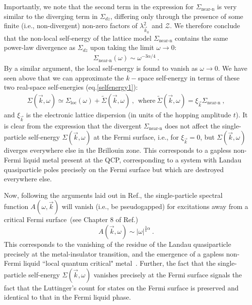 \documentclass[reprint,hidelinks,onecolumn]{revtex4-2}
\begin{document}
Importantly, we note that the second term in the expression for \(\Sigma_\text{near-n}\) is very similar to the diverging term in \(\Sigma_{dz}\), differing only through the presence of some finite (i.e., non-divergent) non-zero factors of \(\lambda_{\vec k_0}^2\) and \(\mathcal{Z}\). We therefore conclude that the non-local self-energy of the lattice model $\Sigma_\text{near-n}$ contains the same power-law divergence  as $\Sigma_{dz}$ upon taking the limit $\omega\to 0$:
\begin{equation}\begin{aligned}
	\Sigma_\text{near-n}\left( \omega \right) \sim \omega^{-3\alpha/4}~.
\end{aligned}\end{equation}
By a similar argument, the local self-energy is found to vanish as \(\omega \to 0\). We have seen above that we can approximate the \(k-\)space self-energy in terms of these two real-space self-energies (eq.\eqref{selfenergy1}):
\begin{equation}\begin{aligned}
	\Sigma(\vec k, \omega) \simeq \Sigma_\text{loc}(\omega) + \tilde{\Sigma}(\vec k, \omega)~,~~\textrm{where}~\tilde{\Sigma}(\vec k, \omega)=\xi_{\vec k}\Sigma_\text{near-n}~,
\end{aligned}\end{equation}
and $\xi_{\vec{k}}$ is the electronic lattice dispersion (in units of the hopping amplitude $t$). It is clear from the expression that the divergent $\Sigma_\text{near-n}$ does not affect the single-particle self-energy $\Sigma(\vec k,\omega)$ at the Fermi surface, i.e., for $\xi_{\vec{k}}= 0$, but $\Sigma(\vec k,\omega)$ diverges everywhere else in the Brillouin zone. This corresponds to a gapless non-Fermi liquid metal present at the QCP, corresponding to a system with Landau quasiparticle poles precisely on the Fermi surface but which are destroyed everywhere else.

Now, following the arguments laid out in Ref.\cite{sujan2023}, the single-particle spectral function $A(\omega,\vec{k})$ will vanish (i.e., be pseudogapped) for excitations away from a critical Fermi surface~(see Chapter 8 of Ref.\cite{carr2010})
\begin{equation}
A(\vec{k},\omega) \sim |\omega|^{\frac{3}{4}\alpha}~.
\end{equation}	
This corresponds to the vanishing of the residue of the Landau quasiparticle precisely at the metal-insulator transition, and the emergence of a gapless non-Fermi liquid ``local quantum critical" metal~\cite{Si2001}. Further, the fact that the single-particle self-energy $\Sigma(\vec k, \omega)$ vanishes precisely at the Fermi surface signals the fact that the Luttinger's count for states on the Fermi surface is preserved and identical to that in the Fermi liquid phase. 
\end{document}
